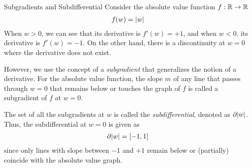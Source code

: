 %
\begin{frame}{Subgradients and Subdifferential}
    Consider the absolute value function $f: {\mathord{\mathbb R}} \to {\mathord{\mathbb R}}$
    \begin{align*}
        f(w) = \lvert w\rvert
    \end{align*}
%
    When $w > 0$, we can see that its derivative is $f'(w) = +1$, and
    when $w<0$, its derivative is $f'(w) = -1$. On the other hand, there is a
    discontinuity at $w=0$ where the derivative does not exist. 
%    
\medskip

    However, we use the concept of a {\em subgradient} that
    generalizes the notion of a derivative. For the absolute value
    function, the slope $m$ of any line that passes
    through $w=0$ that remains below or touches the graph of $f$ is
    called a
    subgradient of $f$ at $w=0$. 

\medskip

The set of all the
    subgradients at $w$ is called the {\em subdifferential}, denoted
    as $\partial\lvert w\rvert$. Thus, the subdifferential at $w=0$ is given
    as
    \begin{align*}
        \partial\lvert w\rvert = [-1,1]
    \end{align*}
    since only lines with slope between $-1$ and $+1$ remain below
    or (partially) coincide with the absolute value graph.
%
\end{frame}

